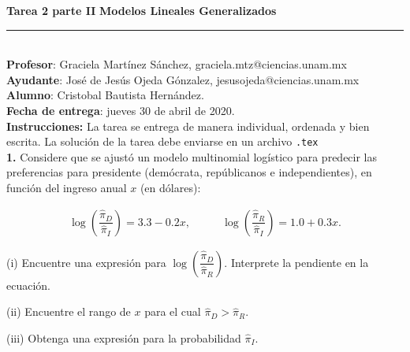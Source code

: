 \documentclass[12pt,a4paper,oneside]{article}
\begin{document}
\noindent \textbf{Tarea 2 parte II} \hfill\textbf{Modelos Lineales Generalizados} \\[-2ex]
\rule{\textwidth}{0.5pt}\\

	
\noindent 	\textbf{Profesor}: Graciela Martínez Sánchez, graciela.mtz@ciencias.unam.mx\\
\textbf{Ayudante}: José de Jesús Ojeda Gónzalez, jesusojeda@ciencias.unam.mx\\
\textbf{Alumno}: Cristobal Bautista Hernández.\\
\textbf{Fecha de entrega}: jueves 30 de abril de 2020.\\[2ex]
\noindent \textbf{Instrucciones:} La tarea se entrega de manera individual, ordenada y bien escrita.  La solución de la tarea debe enviarse en un archivo \texttt{.tex}\\



\noindent \textbf{1. } Considere que se ajustó un modelo multinomial logístico  para predecir las preferencias para presidente (demócrata, repúblicanos e independientes), en función del ingreso anual $x$ (en dólares):

\[\begin{array}{cc}
\log \left(\dfrac{\hat \pi_{D}}{\hat \pi_{I}}\right)  = 3.3 - 0.2 x,& \qquad
\log \left(\dfrac{\hat \pi_{R}}{\hat \pi_{I}}\right) = 1.0 + 0.3 x.
\end{array}\]

\begin{compactenum}

\item[(i)] Encuentre una expresión para $\log \left(\dfrac{\hat \pi_D}{\hat \pi_R}\right)$. Interprete la pendiente en la ecuación.
\item[(ii)] Encuentre el rango de $x$ para el cual $\hat \pi_D>\hat \pi_R$.
\item[(iii)]Obtenga una expresión para la probabilidad $\hat \pi_I$.\\
\end{compactenum}
\end{document}
